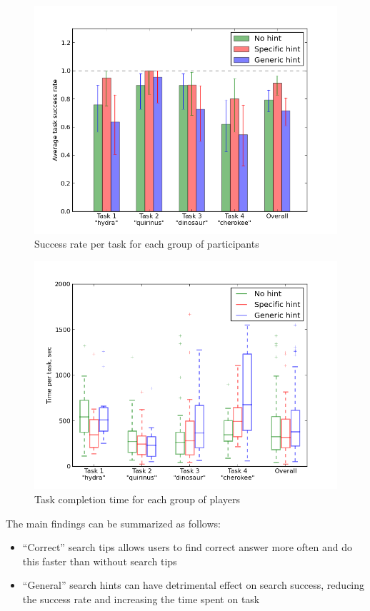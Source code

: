 \documentclass{sig-alternate}
\begin{document}
\begin{figure}
\centering
\includegraphics[scale=0.45]{img/success_per_task}
\caption{Success rate per task for each group of participants}
\label{figure:task_success}
\end{figure}

\begin{figure}
\centering
\includegraphics[scale=0.45]{img/time_per_task}
\caption{Task completion time for each group of players}
\label{figure:task_time}
\end{figure}


The main findings can be summarized as follows:
\begin{itemize}
\item ``Correct'' search tips allows users to find correct answer more often and do this faster than without search tips
\item ``General'' search hints can have detrimental effect on search success, reducing the success rate and increasing the time spent on task
\end{itemize}
\end{document}
